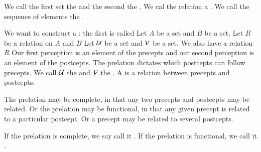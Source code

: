 We call the first set the
 and the second the
. We cal the relation
a .
We call the sequence of elements
the .

We want to construct a
: the
first is called
Let $A$ be a set and $B$
be a set. Let $R$ be a relation
on $A$ and $B$
Let $\mathcal{U}$ be a set
and $\mathcal{V}$ be a set.
We also have a relation $R$
Our first perception is an
element of the precepts and
our second perception is an
element of the postcepts.
The prelation dictates which
postcepts can follow precepts.
We call $\mathcal{U}$ the
and $\mathcal{V}$ the .
A  is
a relation between precepts
and postcepts.


The prelation may be
complete, in that any two precepts
and postcepts may be related.
Or the prelation may
be functional, in that any given
precept is related to a particular
postcept.
Or a precept may be related
to several postcepts.

If the prelation is complete, we say
call it .
If the prelation is functional, we call
it .
\strats
